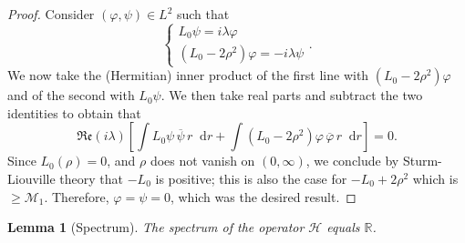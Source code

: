 \documentclass[11 pt]{amsart}
\newtheorem{lem}{Lemma}[section]
\theoremstyle{definition}
\theoremstyle{remark}
\numberwithin{equation}{section}
\newcommand{\dd}{\mathop{}\!\mathrm{d}}
\begin{document}
\begin{proof}
Consider $(\varphi,\psi) \in L^2$ such that
$$
\begin{cases} L_0 \psi = i \lambda \varphi \\ (L_0 - 2 \rho^2) \varphi = - i \lambda \psi \end{cases}.
$$
We now take the (Hermitian) inner product of the first line with $(L_0-2\rho^2) \varphi$ and of the second with $L_0 \psi$. We then take real parts and subtract the two identities to obtain that
$$
\mathfrak{Re} (i \lambda) \left[ \int L_0 \psi \, \overline{\psi} \, r \dd r + \int (L_0 - 2\rho^2) \varphi \, \overline{\varphi} \, r \dd r \right] = 0.
$$
Since $L_0(\rho) =0$, and $\rho$ does not vanish on $(0,\infty)$, we conclude by Sturm-Liouville theory that $-L_0$ is positive; this is also the case for $-L_0 + 2\rho^2$ which is $\geq \mathcal{M}_1$. Therefore, $\varphi = \psi = 0$, which was the desired result.
\end{proof}

\begin{lem}[Spectrum] \label{lemmaessential}
The spectrum of the operator $\mathcal{H}$ equals $\mathbb{R}$.
\end{lem}
\end{document}
